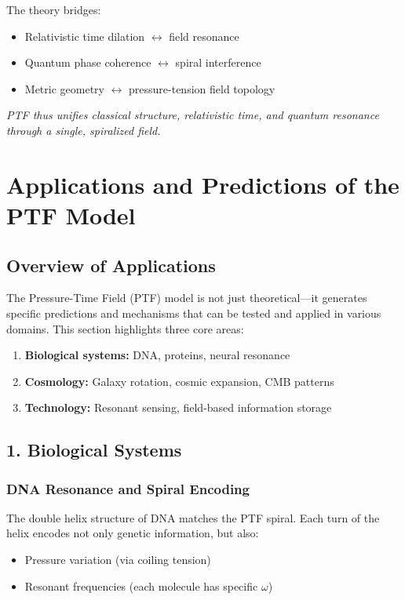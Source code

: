 \documentclass[a4paper,12pt]{article}
\begin{document}
The theory bridges:
\begin{itemize}
    \item Relativistic time dilation $\leftrightarrow$ field resonance
    \item Quantum phase coherence $\leftrightarrow$ spiral interference
    \item Metric geometry $\leftrightarrow$ pressure-tension field topology
\end{itemize}

\vspace{1em}
\noindent
\textit{PTF thus unifies classical structure, relativistic time, and quantum resonance through a single, spiralized field.}

\section{Applications and Predictions of the PTF Model}
\label{sec:applications_predictions}

\subsection{Overview of Applications}

The Pressure-Time Field (PTF) model is not just theoretical—it generates specific predictions and mechanisms that can be tested and applied in various domains. This section highlights three core areas:

\begin{enumerate}
    \item \textbf{Biological systems:} DNA, proteins, neural resonance
    \item \textbf{Cosmology:} Galaxy rotation, cosmic expansion, CMB patterns
    \item \textbf{Technology:} Resonant sensing, field-based information storage
\end{enumerate}

\subsection{1. Biological Systems}

\subsubsection*{DNA Resonance and Spiral Encoding}

The double helix structure of DNA matches the PTF spiral.  
Each turn of the helix encodes not only genetic information, but also:
\begin{itemize}
    \item Pressure variation (via coiling tension)
    \item Resonant frequencies (each molecule has specific $\omega$)
\end{itemize}
\end{document}
